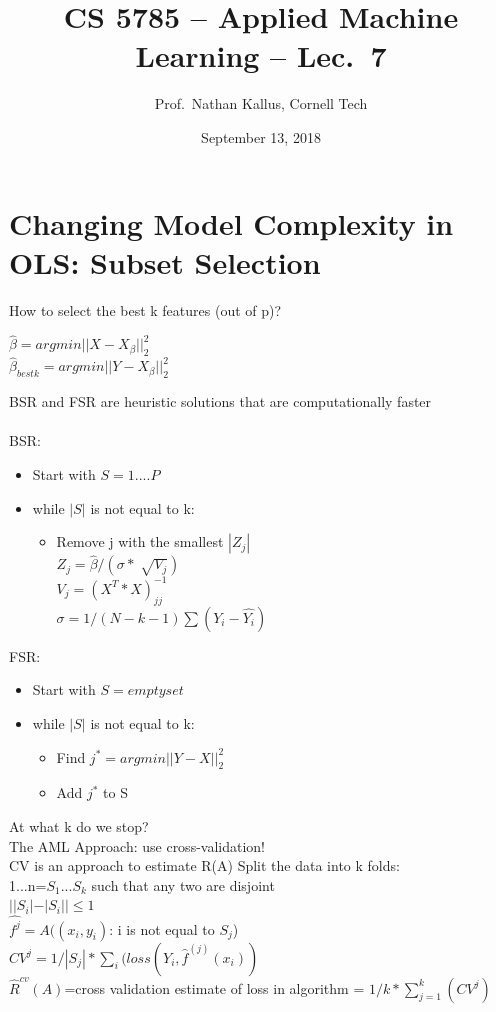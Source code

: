 \documentclass[a4paper]{article}
\title{CS 5785 -- Applied Machine Learning -- Lec.\ 7}
\author{Prof.\ Nathan Kallus, Cornell Tech}
\date{September 13, 2018}
\begin{document}
\maketitle

\section{Changing Model Complexity in OLS: Subset Selection}

How to select the best k features (out of p)?
\begin{center}
  $\hat{\beta}=argmin||X-X_\beta||_2^2$
  \\
  $\hat{\beta}_{best k}= argmin||Y-X_\beta||_2^2$
\end{center}

BSR and FSR are heuristic solutions that are computationally faster
\\
\\
BSR:
\begin{itemize}
 \item Start with $S={1....P}$
 \item while $|S|$ is not equal to k:
 \begin{itemize}
 \item Remove j with the smallest $|Z_j|$
 \\$Z_j=\hat{\beta}/(\sigma*\sqrt[]{V_j})$ 
 \\$V_j=(X^T*X)^{-1}_{jj}$
 \\$\sigma=1/(N-k-1)\sum(Y_i-\hat{Y_i})$ 	%
 \end{itemize}
\end{itemize}

FSR:
\begin{itemize}
  \item Start with $S={empty set}$
  \item while $|S|$ is not equal to k:
  \begin{itemize}
  \item Find $j^*=argmin||Y-X||_2^2$
  \item Add $j^*$ to S						%
 \end{itemize}
\end{itemize}

At what k do we stop?
\\The AML Approach: use cross-validation!
\\CV is an approach to estimate R(A)
Split the data into k folds:
\\{1...n}=$S_1...S_k$ such that any two are disjoint 
\\$||S_i|-|S_i||\leq 1$				%
\\ $\hat{f^j}=A((x_i,y_i)$: i is not equal to $S_j$)
\\$CV^j=1/|S_j|*\sum_i(loss(Y_i,\hat{f}^{(j)}(x_i))$
\\$\hat{R}^{cv}(A)$=cross validation estimate of loss in algorithm = $1/k*\sum_{j=1}^k (CV^j)$
\\
\end{document}
